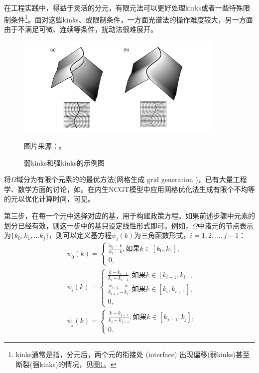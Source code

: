 在工程实践中，得益于灵活的分元，有限元法可以更好处理kinks或者一些特殊限制条件\footnote{kinks通常是指，分元后，两个元的衔接处 (interface) 出现偏移(弱kinks)甚至断裂(强kinks)的情况，见图\ref{fig:pj-kinks}。}。面对这些kinks、或限制条件，一方面光谱法的操作难度较大，另一方面由于不满足可微、连续等条件，扰动法很难展开。
\begin{figure}[htbp]
   \caption[kinks]{弱kinks和强kinks的示例图}
  \centering
  \includegraphics[width=10cm]{./Figures/20170921-kinks-fem}
  \label{fig:pj-kinks}

  \small{图片来源：\cite[Figure 2]{Fries:2010hj}。}
\end{figure}

将$\Omega$域分为有限个元素的的最优方法(网格生成 grid generation )，已有大量工程学、数学方面的讨论，如\cite{Thompson:1985ug}。在内生NCGT模型中应用网格优化法生成有限个不均等的元以优化计算时间，可见\cite{FernandezVillaverde:2004fg}。

第三步，在每一个元中选择对应的基，用于构建政策方程。如果前述步骤中元素的划分已经有效，则这一步中的基只设定线性形式即可。例如，$\Omega$中诸元的节点表示为$\{k_0, k_1, \ldots k_j\}$，则可以定义基方程$\psi_{i}(k)$为三角函数形式，$i = 1,2,\ldots,j-1$：
\begin{subequations}
\label{eq:pj-fem-base-tent}
\begin{align}
  \label{eq:pj-fem-base-tent-a}
  &\psi_0(k) =
  \begin{cases}
  \frac{k_0 - k}{k_1-k} , \text{如果} k \in [k_0,k_1], \\
  0,
  \end{cases} \\
  \label{eq:pj-fem-base-tent-b}
  &\psi_i(k) =
  \begin{cases}
    \frac{k - k_{i-1}}{k_i - k_{i-1}}, \text{如果} k \in [k_{i-1},k_{i}],\\
    \frac{k_{i+1} - k}{k_{i+1} - k_i}, \text{如果} k \in [k_{i},k_{i+1}], \\
    0,
  \end{cases}\\
  \label{eq:pj-fem-base-tent-c}
  &\psi_j(k) =
  \begin{cases}
  \frac{k - k_{j-1}}{k_{j}-k_{j-1}}, \text{如果} k \in [k_{j-1},k_{j}],\\
  0.
  \end{cases}
\end{align}
\end{subequations}

